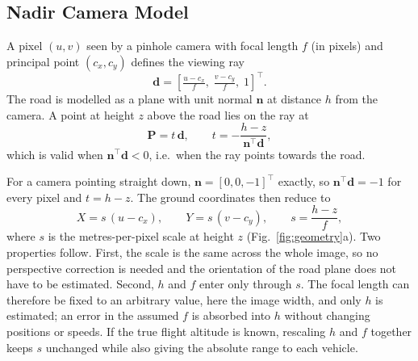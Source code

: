 \documentclass[conference]{IEEEtran}
\begin{document}
\subsection{Nadir Camera Model}

A pixel $(u,v)$ seen by a pinhole camera with focal length $f$ (in pixels) and principal point $(c_x,c_y)$ defines the viewing ray
\begin{equation}
\mathbf{d} = \left[\tfrac{u-c_x}{f},\; \tfrac{v-c_y}{f},\; 1\right]^{\top}.
\end{equation}
The road is modelled as a plane with unit normal $\mathbf{n}$ at distance $h$ from the camera. A point at height $z$ above the road lies on the ray at
\begin{equation}
\mathbf{P} = t\,\mathbf{d}, \qquad t = -\frac{h-z}{\mathbf{n}^{\top}\mathbf{d}},
\end{equation}
which is valid when $\mathbf{n}^{\top}\mathbf{d} < 0$, i.e.\ when the ray points towards the road.

For a camera pointing straight down, $\mathbf{n} = [0,0,-1]^{\top}$ exactly, so $\mathbf{n}^{\top}\mathbf{d} = -1$ for every pixel and $t = h-z$. The ground coordinates then reduce to
\begin{equation}
X = s\,(u-c_x), \qquad Y = s\,(v-c_y), \qquad s = \frac{h-z}{f},
\label{eq:nadir}
\end{equation}
where $s$ is the metres-per-pixel scale at height $z$ (Fig.~\ref{fig:geometry}a). Two properties follow. First, the scale is the same across the whole image, so no perspective correction is needed and the orientation of the road plane does not have to be estimated. Second, $h$ and $f$ enter only through $s$. The focal length can therefore be fixed to an arbitrary value, here the image width, and only $h$ is estimated; an error in the assumed $f$ is absorbed into $h$ without changing positions or speeds. If the true flight altitude is known, rescaling $h$ and $f$ together keeps $s$ unchanged while also giving the absolute range to each vehicle.
\end{document}
